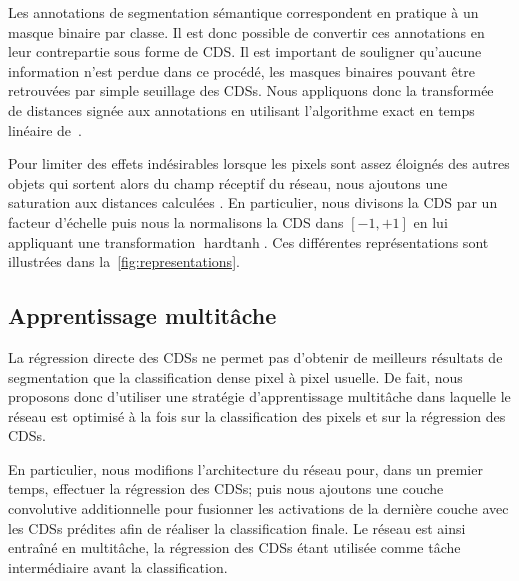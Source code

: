 Les annotations de segmentation sémantique correspondent en pratique à un masque binaire par classe. Il est donc possible de convertir ces annotations en leur contrepartie sous forme de \gls{CDS}. Il est important de souligner qu'aucune information n'est perdue dans ce procédé, les masques binaires pouvant être retrouvées par simple seuillage des \glspl{CDS}. Nous appliquons donc la transformée de distances signée aux annotations en utilisant l'algorithme exact en temps linéaire de~\citet{maurer_linear_2003}.

Pour limiter des effets indésirables lorsque les pixels sont assez éloignés des autres objets qui sortent alors du champ réceptif du réseau, nous ajoutons une saturation aux distances calculées . En particulier, nous divisons la \gls{CDS} par un facteur d'échelle puis nous la normalisons la \gls{CDS} dans $[-1,+1]$ en lui appliquant une transformation $\operatorname{hardtanh}$. Ces différentes représentations sont illustrées dans la~\cref{fig:representations}.

\begin{figure*}[!t]
	\centering
	\resizebox{\textwidth}{!}{}
    \label{fig:distance_framework}
\end{figure*}

\subsection{Apprentissage multitâche}

La régression directe des \glspl{CDS} ne permet pas d'obtenir de meilleurs résultats de segmentation que la classification dense pixel à pixel usuelle. De fait, nous proposons donc d'utiliser une stratégie d'apprentissage multitâche dans laquelle le réseau est optimisé à la fois sur la classification des pixels et sur la régression des \glspl{CDS}.

En particulier, nous modifions l'architecture du réseau pour, dans un premier temps, effectuer la régression des \glspl{CDS}; puis nous ajoutons une couche convolutive additionnelle pour fusionner les activations de la dernière couche avec les \glspl{CDS} prédites afin de réaliser la classification finale. Le réseau est ainsi entraîné en multitâche, la régression des \glspl{CDS} étant utilisée comme tâche intermédiaire avant la classification.

